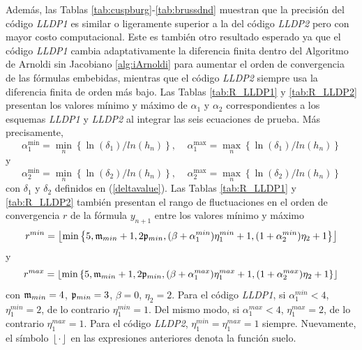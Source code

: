 Además, las Tablas \ref{tab:cuspburg}-\ref{tab:brussdnd} muestran que la precisión del código \emph{LLDP1} es similar o ligeramente superior a la del código \emph{LLDP2} pero con mayor costo computacional. Este es también otro resultado esperado ya que el código \emph{LLDP1} cambia adaptativamente la diferencia finita dentro del Algoritmo de Arnoldi sin Jacobiano \ref{alg:iArnoldi} para aumentar el orden de convergencia de las fórmulas embebidas, mientras que el código \emph{ LLDP2} siempre usa la diferencia finita de orden más bajo. Las Tablas \ref{tab:R_LLDP1} y \ref{tab:R_LLDP2} presentan los valores mínimo y máximo de $\alpha _{1}$ y $\alpha _{2}$ correspondientes a los esquemas \emph{LLDP1} y \emph{LLDP2} al integrar las seis ecuaciones de prueba. Más precisamente,
\[\alpha _{1}^{\min }=\underset{n}{\min }\left\{ \ln (\delta
_{1})/ln(h_{n})\right\}, \;\;\;\; \alpha _{1}^{\max }=\underset{n}{\max }\left\{
\ln (\delta _{1})/ln(h_{n})\right\}\]
y
\[\alpha _{2}^{\min }=\underset{n}{\min }\left\{ \ln (\delta _{2})/ln(h_{n})\right\}, \;\;\;\; \alpha _{2}^{\max }=\underset{n}{\max }\left\{ \ln (\delta _{2})/ln(h_{n})\right\} \]
con $\delta_{1}$ y $\delta_{2}$ definidos en (\ref{deltavalue}). Las Tablas \ref{tab:R_LLDP1} y \ref{tab:R_LLDP2} también presentan el rango de fluctuaciones en el orden de convergencia $r$ de la fórmula $y_{n+1}$ entre los valores mínimo y máximo
\[r^{min}=\left\lfloor\mathrm{min}\left\{5,\mathfrak{m}_{min}+1,2\mathfrak{p}_{min},(\beta+\alpha^{min}_1)\eta^{min}_1+1,(1+\alpha^{min}_2)\eta_2+1 \right\} \right\rfloor\]
y
\[r^{max}=\left\lfloor\mathrm{min}\left\{5,\mathfrak{m}_{min}+1,2\mathfrak{p}_{min},(\beta+\alpha^{max}_1)\eta^{max}_1+1,(1+\alpha^{max}_2)\eta_2+1 \right\} \right\rfloor\]
con $\mathfrak{m}_{min}=4$, $\mathfrak{p}_{min}=3$, $\beta=0$, $\eta_2=2$. Para el código \emph{LLDP1}, si $\alpha^{min}_1 < 4$, $\eta^{min}_1=2$, de lo contrario $\eta^{min}_1=1$. Del mismo modo, si $\alpha^{max}_1 < 4$, $\eta^{max}_1=2$, de lo contrario $\eta^{max}_1=1$. Para el código \emph{LLDP2}, $\eta^{min}_1=\eta^{max}_1=1$ siempre. Nuevamente, el símbolo $\left\lfloor \cdot \right\rfloor$ en las expresiones anteriores denota la función suelo.

